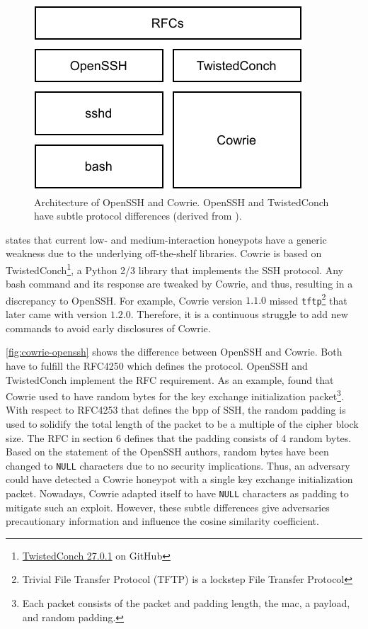\begin{figure}[htbp]
    \centering
    \includegraphics{figures/cowrie-openssh.pdf}
    \caption[Architecture of OpenSSH and Cowrie]{
        Architecture of OpenSSH and Cowrie.
        OpenSSH and TwistedConch have subtle protocol differences (derived from \cite{vetterl2020}).
    }
    \label{fig:cowrie-openssh}
\end{figure}

\citet{vetterl2020} states that current low- and medium-interaction honeypots have a generic weakness due to the underlying off-the-shelf libraries.
Cowrie is based on TwistedConch\footnote{\href{https://github.com/twisted/twisted/commit/4e3b22afe1f76b360733b65d6b835b7aaae6deb6}{TwistedConch 27.0.1} on GitHub}, a Python 2/3 library that implements the SSH protocol.
Any bash command and its response are tweaked by Cowrie, and thus, resulting in a discrepancy to OpenSSH.
For example, Cowrie version $1.1.0$ missed \verb|tftp|\footnote{Trivial File Transfer Protocol (TFTP) is a lockstep File Transfer Protocol} that later came with version $1.2.0$.
Therefore, it is a continuous struggle to add new commands to avoid early disclosures of Cowrie.

\autoref{fig:cowrie-openssh} shows the difference between OpenSSH and Cowrie.
Both have to fulfill the RFC4250 \cite{rfc4250} which defines the protocol.
OpenSSH and TwistedConch implement the RFC requirement.
As an example, \citet{vetterl2020} found that Cowrie used to have random bytes for the key exchange initialization packet\footnote{Each packet consists of the packet and padding length, the \ac{mac}, a payload, and random padding.}.
With respect to RFC4253 \cite{rfc4253} that defines the \ac{bpp} of SSH, the random padding is used to solidify the total length of the packet to be a multiple of the cipher block size.
The RFC in section 6 defines that the padding consists of 4 random bytes.
Based on the statement of the OpenSSH authors, random bytes have been changed to \verb|NULL| characters due to no security implications.
Thus, an adversary could have detected a Cowrie honeypot with a single key exchange initialization packet.
Nowadays, Cowrie adapted itself to have \verb|NULL| characters as padding to mitigate such an exploit.
However, these subtle differences give adversaries precautionary information and influence the cosine similarity coefficient.

